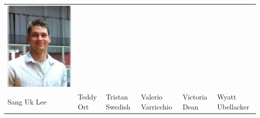 \documentclass[landscape,a0paper,fontscale=0.292]{baposter}
\begin{document}
\begin{poster}
{\begin{center}
\begin{tabularx}{\linewidth}{X X X X X X}
{\centering \includegraphics[width=0.6\linewidth]{wubella.jpg}}\\ 

{\tiny \centering Sang Uk Lee }& {\tiny \centering Teddy Ort }& {\tiny \centering Tristan Swedish }& {\tiny \centering Valerio Varricchio }& {\tiny \centering Victoria Dean }& {\tiny \centering Wyatt Ubellacker }\\ 
 
 
            \end{tabularx}
            \end{center}
            
            }

\end{poster}%
%
\end{document}
